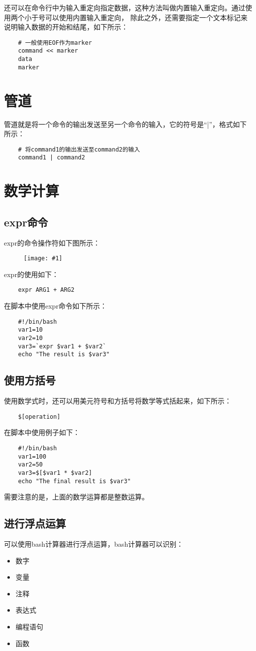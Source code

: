 \documentclass[a4paper,left=1.5cm,right=1.5cm,11pt]{article}
\newcommand{\fic}[1]{\begin{figure}[H]
		\center
		\texttt{[image: \#1]}
	\end{figure}}
\begin{document}
	还可以在命令行中为输入重定向指定数据，这种方法叫做内置输入重定向。通过使用两个小于号可以使用内置输入重定向，
	除此之外，还需要指定一个文本标记来说明输入数据的开始和结尾，如下所示：
	\begin{lstlisting}
	# 一般使用EOF作为marker
	command << marker
	data
	marker
	\end{lstlisting}

\section{管道}
	管道就是将一个命令的输出发送至另一个命令的输入，它的符号是“|”，格式如下所示：
	\begin{lstlisting}
	# 将command1的输出发送至command2的输入
	command1 | command2
	\end{lstlisting}

\section{数学计算}
\subsection{expr命令}
	expr的命令操作符如下图所示：
	\fic{3.png}

	expr的使用如下：
	\begin{lstlisting}
	expr ARG1 + ARG2
	\end{lstlisting}

	在脚本中使用expr命令如下所示：
	\begin{lstlisting}
	#!/bin/bash
	var1=10
	var2=10
	var3=`expr $var1 + $var2`
	echo "The result is $var3"
	\end{lstlisting}

\subsection{使用方括号}
	使用数学式时，还可以用美元符号和方括号将数学等式括起来，如下所示：
	\begin{lstlisting}
	$[operation]
	\end{lstlisting}

	在脚本中使用例子如下：
	\begin{lstlisting}
	#!/bin/bash
	var1=100
	var2=50
	var3=$[$var1 * $var2]
	echo "The final result is $var3"
	\end{lstlisting}

	需要注意的是，上面的数学运算都是整数运算。

\subsection{进行浮点运算}
	可以使用bash计算器进行浮点运算，bash计算器可以识别：
	\begin{itemize}
		\item 数字
		\item 变量
		\item 注释
		\item 表达式
		\item 编程语句
		\item 函数
	\end{itemize}
	
\end{document}
